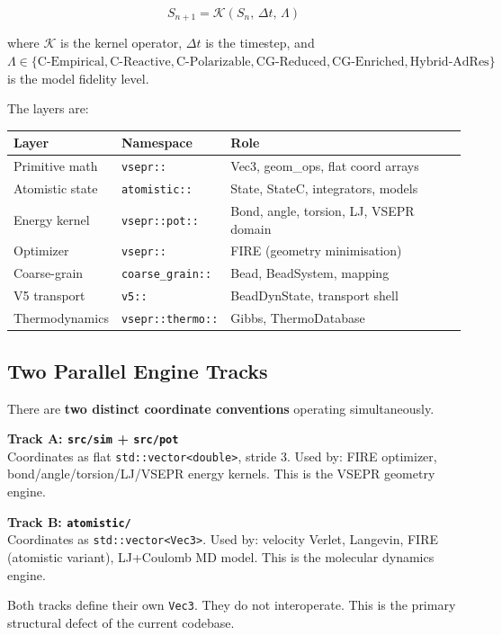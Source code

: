 \documentclass[11pt,a4paper]{article}
\begin{document}
\[
S_{n+1} = \mathcal{K}(S_n,\, \Delta t,\, \Lambda)
\]

where $\mathcal{K}$ is the kernel operator, $\Delta t$ is the timestep, and
$\Lambda \in \{\text{C-Empirical}, \text{C-Reactive}, \text{C-Polarizable},
\text{CG-Reduced}, \text{CG-Enriched}, \text{Hybrid-AdRes}\}$ is the model fidelity level.

The layers are:

\begin{center}
\begin{tabular}{lll}
\toprule
Layer & Namespace & Role \\
\midrule
Primitive math   & \texttt{vsepr::}       & Vec3, geom\_ops, flat coord arrays \\
Atomistic state  & \texttt{atomistic::}   & State, StateC, integrators, models \\
Energy kernel    & \texttt{vsepr::pot::}  & Bond, angle, torsion, LJ, VSEPR domain \\
Optimizer        & \texttt{vsepr::}       & FIRE (geometry minimisation) \\
Coarse-grain     & \texttt{coarse\_grain::} & Bead, BeadSystem, mapping \\
V5 transport     & \texttt{v5::}          & BeadDynState, transport shell \\
Thermodynamics   & \texttt{vsepr::thermo::} & Gibbs, ThermoDatabase \\
\bottomrule
\end{tabular}
\end{center}

\subsection{Two Parallel Engine Tracks}

There are \textbf{two distinct coordinate conventions} operating simultaneously.

\textbf{Track A: \texttt{src/sim} + \texttt{src/pot}} \\
Coordinates as flat \texttt{std::vector<double>}, stride 3.
Used by: FIRE optimizer, bond/angle/torsion/LJ/VSEPR energy kernels.
This is the VSEPR geometry engine.

\textbf{Track B: \texttt{atomistic/}} \\
Coordinates as \texttt{std::vector<Vec3>}.
Used by: velocity Verlet, Langevin, FIRE (atomistic variant), LJ+Coulomb MD model.
This is the molecular dynamics engine.

Both tracks define their own \texttt{Vec3}. They do not interoperate.
This is the primary structural defect of the current codebase.
\end{document}
